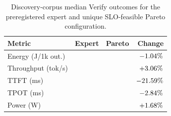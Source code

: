 \begin{table}[t]
\centering
\caption{Discovery-corpus median Verify outcomes for the preregistered expert
and unique SLO-feasible Pareto configuration.}
\label{tab:configuration-results}
\footnotesize
\setlength{\tabcolsep}{3.0pt}
\begin{tabular}{lrrr}
\toprule
Metric & Expert & Pareto & Change \\
\midrule
Energy (J/1k out.) & \ExpertEnergy{} & \ParetoEnergy{} & $-1.04\%{}$ \\
Throughput (tok/s) & \ExpertThroughput{} & \ParetoThroughput{} & $+3.06\%{}$ \\
TTFT (ms) & \ExpertTTFT{} & \ParetoTTFT{} & $-21.59\%{}$ \\
TPOT (ms) & \ExpertTPOT{} & \ParetoTPOT{} & $-2.84\%{}$ \\
Power (W) & \ExpertPower{} & \ParetoPower{} & $+1.68\%{}$ \\
\bottomrule
\end{tabular}
\end{table}
